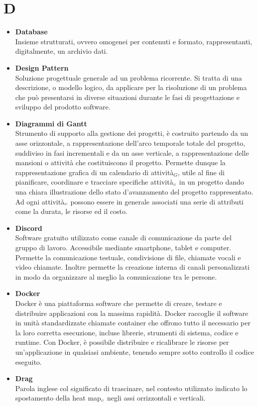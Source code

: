 \chapter{D} \label{D}
	\begin{itemize}
		\item \textbf{Database} \\
		Insieme strutturati, ovvero omogenei per contenuti e formato, rappresentanti, digitalmente, un archivio dati.
		
		\item \textbf{Design Pattern}\\
		Soluzione progettuale generale ad un problema ricorrente. Si tratta di una descrizione, o modello logico, da applicare per la risoluzione di un problema che può presentarsi in diverse situazioni durante le fasi di progettazione e sviluppo del prodotto software.

		\item \textbf{Diagrammi di Gantt}\\
		Strumento di supporto alla gestione dei progetti, è costruito partendo da un asse orizzontale, a rappresentazione dell'arco temporale totale del progetto, suddiviso in fasi incrementali  e da un asse verticale, a rappresentazione delle mansioni o attività che costituiscono il progetto. Permette dunque la rappresentazione grafica di un calendario di attività$_G$, utile al fine di pianificare, coordinare e tracciare specifiche attività$_{\scaleto{G}{3pt}}$ in un progetto dando una chiara illustrazione dello stato d'avanzamento del progetto rappresentato.  Ad ogni attività$_{\scaleto{G}{3pt}}$ possono essere in generale associati una serie di attributi come la durata, le risorse ed il costo.

		\item \textbf{Discord}\\
		Software gratuito utilizzato come canale di comunicazione da parte del gruppo di lavoro.
		Accessibile mediante smartphone, tablet e computer.
		Permette la comunicazione testuale, condivisione di file, chiamate vocali e video chiamate.
		Inoltre permette la creazione interna di canali personalizzati in modo da organizzare al meglio la comunicazione tra le persone.

		\item \textbf{Docker}\\
		Docker è una piattaforma software che permette di creare, testare e distribuire applicazioni con la massima rapidità. Docker raccoglie il software in unità standardizzate chiamate container che offrono tutto il necessario per la loro corretta esecuzione, incluse librerie, strumenti di sistema, codice e runtime. Con Docker, è possibile distribuire e ricalibrare le risorse per un'applicazione in qualsiasi ambiente, tenendo sempre sotto controllo il codice eseguito.

		\item \textbf{Drag}\\
		Parola inglese col significato di trascinare, nel contesto utilizzato indicato lo spostamento della heat map$_{\scaleto{G}{3pt}}$ negli assi orrizzontali e verticali.
	\end{itemize}
